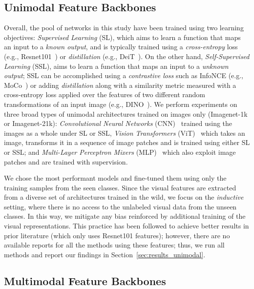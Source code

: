 
\subsection{Unimodal Feature Backbones}




Overall, the pool of networks in this study have been trained using two learning objectives: 
\textit{Supervised Learning} (SL), which aims to learn a function that maps an input to a \textit{known output}, and is typically trained using a \textit{cross-entropy} loss (e.g., Resnet101~\cite{RNs}) or \textit{distillation} (e.g., DeiT~\cite{DeiT}). On the other hand, \textit{Self-Supervised Learning} (SSL), aims to learn a function that maps an input to a \textit{unknown output}; SSL can be accomplished using a \textit{contrastive loss} such as InfoNCE (e.g., MoCo~\cite{MoCo}) or adding \textit{distillation} along with a similarity metric measured with a cross-entropy loss applied over the features of two different random transformations of an input image (e.g., DINO~\cite{DINO}). 
We perform experiments on three broad types of unimodal architectures trained on images only (Imagenet-1k or Imagenet-21k):
\textit{Convolutional Neural Networks} (CNN)~\cite{Alexnet} trained using the images as a whole under SL or SSL, 
\textit{Vision Transformers} (ViT)~\cite{ViT} which takes an image, transforms it in a sequence of image patches and is trained using either SL or SSL; and
\textit{Multi-Layer Perceptron Mixers} (MLP)~\cite{MLPMixer} which also exploit image patches and are trained with supervision.

We chose the most performant models and fine-tuned them using only the training samples from the seen classes. Since the visual features are extracted from a diverse set of architectures trained in the wild, we focus on the \textit{inductive} setting, where there is no access to the unlabeled visual data from the unseen classes. In this way, we mitigate any bias reinforced by additional training of the visual representations. 
This practice has been followed to achieve better results in prior literature (which only uses Resnet101 features); however, there are no available reports for all the methods using these features; thus, we run all methods and report our findings in Section~\ref{sec:results_unimodal}.



\subsection{Multimodal Feature Backbones}

